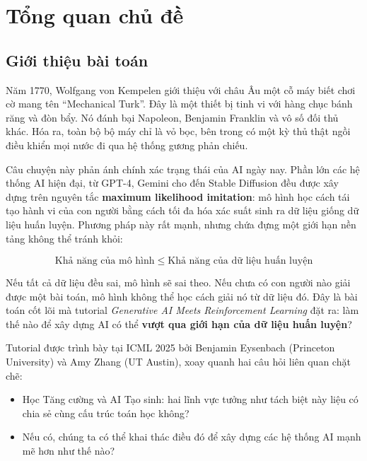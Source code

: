  
\section{Tổng quan chủ đề}
 
\subsection{Giới thiệu bài toán}
 
Năm 1770, Wolfgang von Kempelen giới thiệu với châu Âu một cỗ máy
biết chơi cờ mang tên ``Mechanical Turk''. Đây là một thiết bị tinh vi với
hàng chục bánh răng và đòn bẩy. Nó đánh bại Napoleon, Benjamin
Franklin và vô số đối thủ khác. Hóa ra, toàn bộ bộ máy chỉ là vỏ
bọc, bên trong có một kỳ thủ thật ngồi điều khiển mọi nước đi qua hệ
thống gương phản chiếu.
 
Câu chuyện này phản ánh chính xác trạng thái của AI ngày nay. Phần
lớn các hệ thống AI hiện đại, từ GPT-4, Gemini cho đến Stable
Diffusion đều được xây dựng trên nguyên tắc \textbf{maximum
likelihood imitation}: mô hình học cách tái tạo hành vi của con người
bằng cách tối đa hóa xác suất sinh ra dữ liệu giống dữ liệu huấn
luyện. Phương pháp này rất mạnh, nhưng chứa đựng một giới hạn nền
tảng không thể tránh khỏi:
 
\begin{equation}
    \text{Khả năng của mô hình} \;\leq\; \text{Khả năng của dữ liệu
    huấn luyện}
    \label{eq:imitation_bound}
\end{equation}
 
Nếu tất cả dữ liệu đều sai, mô hình sẽ sai theo. Nếu chưa có con
người nào giải được một bài toán, mô hình không thể học cách giải nó
từ dữ liệu đó. Đây là bài toán cốt lõi mà tutorial
\textit{Generative AI Meets Reinforcement Learning}
\cite{eysenbach2025generativerl} đặt ra: làm thế nào để xây dựng AI có
thể \textbf{vượt qua giới hạn của dữ liệu huấn luyện}?
 
Tutorial được trình bày tại ICML 2025 bởi Benjamin Eysenbach (Princeton
University) và Amy Zhang (UT Austin), xoay quanh hai câu hỏi liên
quan chặt chẽ:
\begin{itemize}
    \item Học Tăng cường và AI Tạo sinh: hai lĩnh vực tưởng
    như tách biệt này liệu có chia sẻ cùng cấu trúc toán học không?
    \item Nếu có, chúng ta có thể khai thác điều đó để xây dựng các hệ
    thống AI mạnh mẽ hơn như thế nào?
\end{itemize}
 
